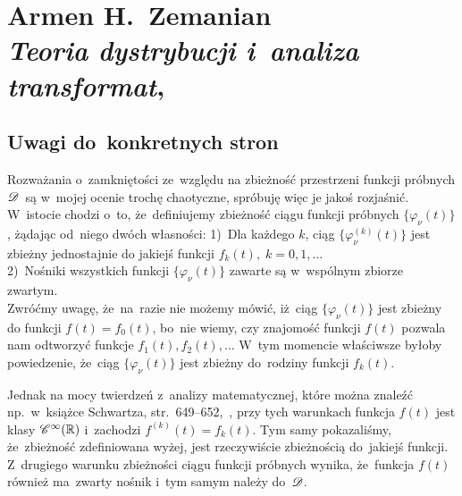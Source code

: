 \documentclass[a4paper,11pt]{article}
\numberwithin{equation}{section}
\begin{document}
\VerSpaceSix













\section{Armen H.~Zemanian \\
  \textit{Teoria dystrybucji i~analiza transformat},
  \cite{ZemanianTeoriaDystrybucjiETC1969}}



\subsection{Uwagi do~konkretnych stron}

\label{sec:Uwagi-do-konkrentych-stron}



\noindent
{} Rozważania o~zamkniętości ze~względu na zbieżność
przestrzeni funkcji próbnych $\mathcal{D}$~są w~mojej ocenie trochę
chaotyczne, spróbuję więc je jakoś rozjaśnić. W~istocie chodzi o~to,
że~definiujemy zbieżność ciągu funkcji próbnych
$\{ \varphi_{ \nu }( t ) \}$, żądając od~niego dwóch własności:
1)~Dla każdego $k$, ciąg $\{ \varphi_{ \nu }^{ ( k ) }( t ) \}$ jest
zbieżny jednostajnie do jakiejś funkcji
$f_{ k }( t ), \; k = 0, 1, \ldots$ \\
2)~Nośniki wszystkich funkcji $\{ \varphi_{ \nu }( t ) \}$ zawarte są
w~wspólnym zbiorze zwartym. \\
Zwróćmy uwagę, że~na~razie nie możemy mówić, iż~ciąg
$\{ \varphi_{ \nu }( t ) \}$ jest zbieżny do funkcji
$f( t ) = f_{ 0 }( t )$, bo~nie wiemy, czy znajomość funkcji $f( t )$
pozwala nam odtworzyć funkcje $f_{ 1 }( t ), f_{ 2 }( t ), \ldots$ W~tym
momencie właściwsze byłoby powiedzenie, że~ciąg
$\{ \varphi_{ \nu }( t ) \}$ jest zbieżny do~rodziny funkcji
$f_{ k }( t )$.

Jednak na mocy twierdzeń z~analizy matematycznej, które można znaleźć
np.~w~książce Schwartza, str.~649--652,~\cite{SchwartzKursAnalizyMatematycznejVolI1979}, przy tych
warunkach funkcja $f( t )$ jest klasy $\mathcal{C}^{ \infty }( \mathbb{R} )$ i~zachodzi
$f^{ ( k ) }( t ) = f_{ k }( t )$. Tym samy pokazaliśmy, że~zbieżność
zdefiniowana wyżej, jest rzeczywiście zbieżnością do~jakiejś funkcji.
Z~drugiego warunku zbieżności ciągu funkcji próbnych wynika,
że~funkcja $f( t )$ również ma~zwarty nośnik i~tym samym należy
do~$\mathcal{D}$.
\end{document}
